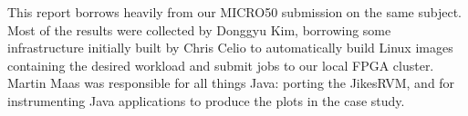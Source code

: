 This report borrows heavily from our MICRO50 submission on the same subject.
Most of the results were collected by Donggyu Kim, borrowing some
infrastructure initially built by Chris Celio to automatically build Linux
images containing the desired workload and submit jobs to our local FPGA
cluster. Martin Maas was responsible for all things Java: porting the JikesRVM,
and for instrumenting Java applications to produce the plots in the case study.




